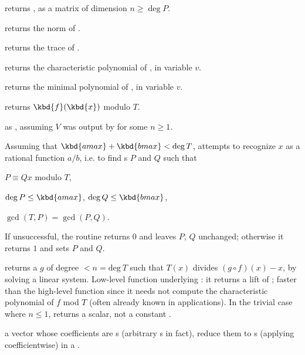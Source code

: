  returns
, as a matrix of dimension $n \geq \deg P$.

 returns the norm of .

 returns the trace of .

 returns the characteristic
polynomial of , in variable $v$.

 returns the minimal
polynomial of , in variable $v$.

 returns $\kbd{f}(\kbd{x})$ modulo
$T$.

 as ,
assuming $V$ was output by  for some $n\geq 1$.

Assuming that $\kbd{amax}+\kbd{bmax}<\deg T$, attempts to recognize $x$ as a
rational function $a/b$, i.e. to find s $P$ and $Q$ such that

\item $P \equiv Q x$ modulo $T$,

\item $\deg P \leq \kbd{amax}$, $\deg Q \leq \kbd{bmax}$,

\item $\gcd(T,P) = \gcd(P,Q)$.

\noindent If unsuccessful, the routine returns $0$ and leaves $P$, $Q$
unchanged; otherwise it returns $1$ and sets $P$ and $Q$.

 returns a  $g$ of degree $< n
= \text{deg}~T$ such that $T(x)$ divides $(g \circ f)(x) - x$, by solving a
linear system. Low-level function underlying : it returns a
lift of \kbd[modreverse(f,T)]; faster than the high-level function since it
needs not compute the characteristic polynomial of $f$ mod $T$ (often already
known in applications). In the trivial case where $n \leq 1$, returns a
scalar, not a constant .


  a vector whose
coefficients are s (arbitrary s in fact), reduce them to
s (applying  coefficientwise) in a .

